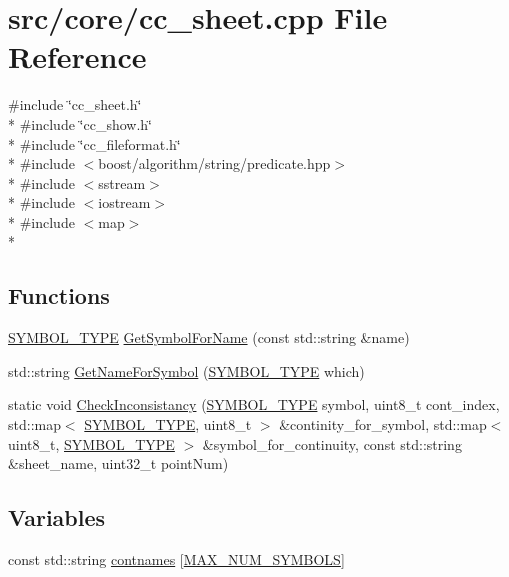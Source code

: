 \hypertarget{a00211}{\section{src/core/cc\-\_\-sheet.cpp File Reference}
\label{a00211}
}
{\ttfamily \#include \char`\"{}cc\-\_\-sheet.\-h\char`\"{}}\\*
{\ttfamily \#include \char`\"{}cc\-\_\-show.\-h\char`\"{}}\\*
{\ttfamily \#include \char`\"{}cc\-\_\-fileformat.\-h\char`\"{}}\\*
{\ttfamily \#include $<$boost/algorithm/string/predicate.\-hpp$>$}\\*
{\ttfamily \#include $<$sstream$>$}\\*
{\ttfamily \#include $<$iostream$>$}\\*
{\ttfamily \#include $<$map$>$}\\*
\subsection*{Functions}
\begin{DoxyCompactItemize}
\item 
\hyperlink{a00216_a68cd84e0300be6f9ff4474682762c9ee}{S\-Y\-M\-B\-O\-L\-\_\-\-T\-Y\-P\-E} \hyperlink{a00211_a4223736e0f1971c520270427c3d6d28e}{Get\-Symbol\-For\-Name} (const std\-::string \&name)
\item 
std\-::string \hyperlink{a00211_a2d4f0cf91f506b230102e3d344bfddbe}{Get\-Name\-For\-Symbol} (\hyperlink{a00216_a68cd84e0300be6f9ff4474682762c9ee}{S\-Y\-M\-B\-O\-L\-\_\-\-T\-Y\-P\-E} which)
\item 
static void \hyperlink{a00211_a68a23b3cb0a9645b93311e64f6334838}{Check\-Inconsistancy} (\hyperlink{a00216_a68cd84e0300be6f9ff4474682762c9ee}{S\-Y\-M\-B\-O\-L\-\_\-\-T\-Y\-P\-E} symbol, uint8\-\_\-t cont\-\_\-index, std\-::map$<$ \hyperlink{a00216_a68cd84e0300be6f9ff4474682762c9ee}{S\-Y\-M\-B\-O\-L\-\_\-\-T\-Y\-P\-E}, uint8\-\_\-t $>$ \&continity\-\_\-for\-\_\-symbol, std\-::map$<$ uint8\-\_\-t, \hyperlink{a00216_a68cd84e0300be6f9ff4474682762c9ee}{S\-Y\-M\-B\-O\-L\-\_\-\-T\-Y\-P\-E} $>$ \&symbol\-\_\-for\-\_\-continuity, const std\-::string \&sheet\-\_\-name, uint32\-\_\-t point\-Num)
\end{DoxyCompactItemize}
\subsection*{Variables}
\begin{DoxyCompactItemize}
\item 
const std\-::string \hyperlink{a00211_ab667dd50e9a4ca23ede569ad1de36188}{contnames} \mbox{[}\hyperlink{a00216_a68cd84e0300be6f9ff4474682762c9eea87b0cb9826d624c9af683d76e0d506f7}{M\-A\-X\-\_\-\-N\-U\-M\-\_\-\-S\-Y\-M\-B\-O\-L\-S}\mbox{]}
\end{DoxyCompactItemize}


